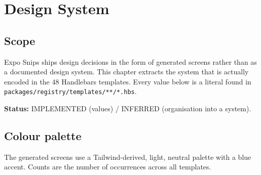 \chapter{Design System}
\label{ch:design-system}

\section{Scope}

Expo Snips ships design decisions in the form of generated screens rather than as a
documented design system. This chapter extracts the system that is actually encoded
in the 48 Handlebars templates. Every value below is a literal found in
\texttt{packages/registry/templates/**/*.hbs}.

\textbf{Status:} IMPLEMENTED (values) / INFERRED (organisation into a system).

\section{Colour palette}

The generated screens use a Tailwind-derived, light, neutral palette with a blue
accent. Counts are the number of occurrences across all templates.

